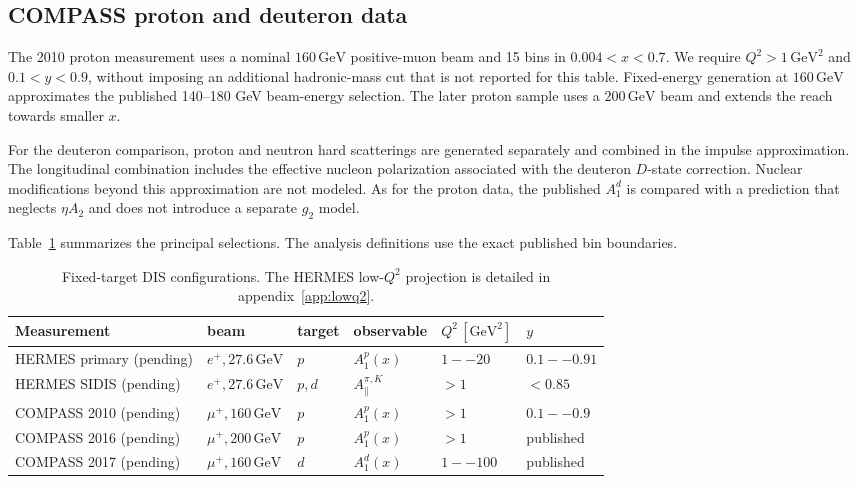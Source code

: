 \documentclass[11pt,a4paper]{article}
\newcommand{\GeV}{\ensuremath{\,\mathrm{GeV}}}
\begin{document}
\FloatBarrier
\subsection{COMPASS proton and deuteron data}

The 2010 proton measurement uses a nominal $160\GeV$ positive-muon beam and
15 bins in $0.004<x<0.7$.  We require $Q^2>1\,\mathrm{GeV}^2$ and
$0.1<y<0.9$, without imposing an additional hadronic-mass cut that is not
reported for this table.  Fixed-energy generation at $160\GeV$ approximates
the published 140--180 GeV beam-energy selection.  The later proton sample
uses a $200\GeV$ beam and extends the reach towards smaller $x$.

For the deuteron comparison, proton and neutron hard scatterings are generated
separately and combined in the impulse approximation.  The longitudinal
combination includes the effective nucleon polarization associated with the
deuteron $D$-state correction.  Nuclear modifications beyond this
approximation are not modeled.  As for the proton data, the published
$A_1^d$ is compared with a prediction that neglects $\eta A_2$ and does not
introduce a separate $g_2$ model.

Table~\ref{tab:dis-selections} summarizes the principal selections.  The
analysis definitions use the exact published bin boundaries.

\begin{table}[!htbp]
  \centering
  \caption{Fixed-target DIS configurations.  The HERMES low-$Q^2$
  projection is detailed in appendix~\ref{app:lowq2}.}
  \label{tab:dis-selections}
  \small
  \begin{tabular}{@{}llllll@{}}
    \toprule
    Measurement & beam & target & observable & $Q^2\,[\mathrm{GeV}^2]$ & $y$ \\
    \midrule
    HERMES primary (pending) & $e^+,27.6\GeV$ & $p$ & $A_1^p(x)$ & $1--20$ & $0.1--0.91$ \\
    HERMES SIDIS (pending) & $e^+,27.6\GeV$ & $p,d$ & $A_\parallel^{\pi,K}$ & $>1$ & $<0.85$ \\
    COMPASS 2010 (pending) & $\mu^+,160\GeV$ & $p$ & $A_1^p(x)$ & $>1$ & $0.1--0.9$ \\
    COMPASS 2016 (pending) & $\mu^+,200\GeV$ & $p$ & $A_1^p(x)$ & $>1$ & published \\
    COMPASS 2017 (pending) & $\mu^+,160\GeV$ & $d$ & $A_1^d(x)$ & $1--100$ & published \\
    \bottomrule
  \end{tabular}
\end{table}
\end{document}
